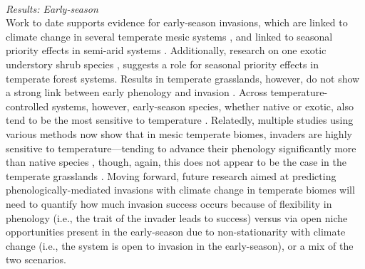 \documentclass[11pt,a4paper,oneside]{article}
\begin{document}
\\

\noindent \emph{Results: Early-season}\\
\noindent  Work to date supports evidence for early-season invasions, which are linked to climate change in several temperate mesic systems \citep{wolkovichAmBot2013}, and linked to seasonal priority effects in semi-arid systems \citep{dickson2012,Wainwright:2012tw}. Additionally, research on one exotic understory shrub species \citep{Xu:2007he}, suggests a role for seasonal priority effects in temperate forest systems. Results in temperate grasslands, however, do not show a strong link between early phenology and invasion \citep{wolkovichAmBot2013}. Across temperature-controlled systems, however, early-season species, whether native or exotic, also tend to be the most sensitive to temperature \citep{Cook:2012,Wolkovich:2012n}. Relatedly, multiple studies using various methods now show that in mesic temperate biomes, invaders are highly sensitive to temperature---tending to advance their phenology significantly more than native species \citep{Willis:2010al,wolkovichAmBot2013}, though, again, this does not appear to be the case in the temperate grasslands \citep{wolkovichAmBot2013}. Moving forward, future research aimed at predicting phenologically-mediated invasions with climate change in temperate biomes will need to quantify how much invasion success occurs because of flexibility in phenology (i.e., the trait of the invader leads to success) versus via open niche opportunities present in the early-season due to non-stationarity with climate change (i.e., the system is open to invasion in the early-season), or a mix of the two scenarios. \\
\end{document}
